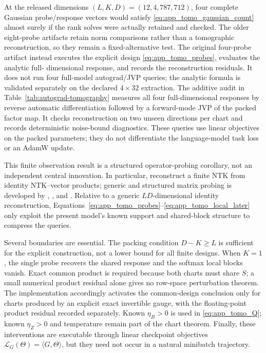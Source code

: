 At the released dimensions $(L,K,D)=(12,4,787{,}712)$, four complete
Gaussian probe/response vectors would satisfy
\eqref{eq:app_tomo_gaussian_count} almost surely if the rank solves were
actually retained and checked.  The older eight-probe artifacts retain norm
comparisons rather than a tomographic reconstruction, so they remain a
fixed-alternative test. The original four-probe artifact instead executes the
explicit design \eqref{eq:app_tomo_probes}, evaluates the analytic full-
dimensional response, and records the reconstruction residuals.  It does not
run four full-model autograd/JVP queries; the analytic formula is validated
separately on the declared $4\times32$ extraction.
The additive audit in Table~\ref{tab:autograd-tomography} measures all four
full-dimensional responses by reverse automatic differentiation followed by
a forward-mode JVP of the packed factor map. It checks reconstruction on
two unseen directions per chart and records deterministic noise-bound
diagnostics. These queries use linear objectives on the packed parameters;
they do not differentiate the language-model task loss or an AdamW update.

This finite observation result is a structured operator-probing corollary,
not an independent central innovation.  In particular,
\citet[Sec.~3.3, Eqs.~(7)--(9)]{novak2022fast} reconstruct a finite NTK from
identity NTK--vector products; generic and structured matrix probing is
developed by \citet{chiu2012matrix}, \citet{halikias2024structured}, and
\citet{amsel2026query}.  Relative to a generic $LD$-dimensional identity
reconstruction, Equations~\ref{eq:app_tomo_probes}--\ref{eq:app_tomo_local_later}
only exploit the present model's known support and shared-block structure to
compress the queries.

Several boundaries are essential.  The packing condition $D-K\ge L$ is
sufficient for the explicit construction, not a lower bound for all finite
designs.  When $K=1$, the single probe recovers the shared response and the
softmax local blocks vanish.  Exact common product is required because both
charts must share $S$; a small numerical product residual alone gives no
row-space perturbation theorem.  The implementation accordingly activates the
common-design conclusion only for charts produced by an explicit exact
invertible gauge, with the floating-point product residual recorded separately.
Known $\eta_B>0$ is used in \eqref{eq:app_tomo_Q}; known $\eta_Z>0$ and
temperature remain part of the chart theorem.  Finally, these interventions
are executable through linear checkpoint objectives
$\mathcal L_G(\Theta)=\langle G,\Theta\rangle$, but they need not occur in a
natural minibatch trajectory.

